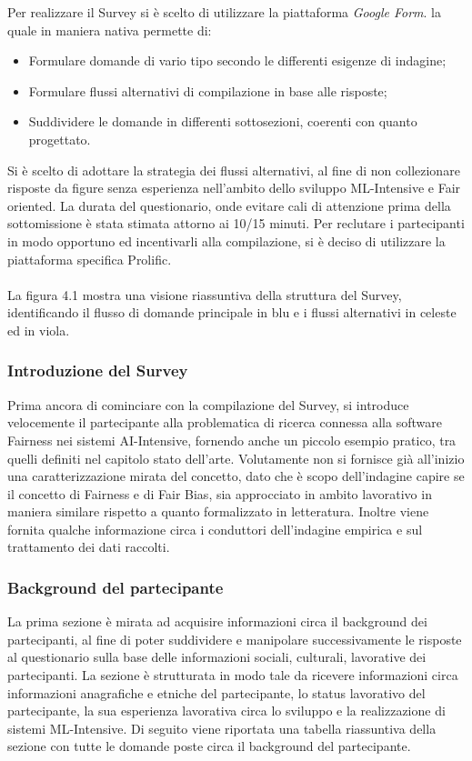     Per realizzare il Survey si è scelto di utilizzare la piattaforma \emph{Google Form}. la quale in maniera nativa permette di:
    \
    \begin{itemize}
        \item Formulare domande di vario tipo secondo le differenti esigenze di indagine;
        \item Formulare flussi alternativi di compilazione in base alle risposte;
        \item Suddividere le domande in differenti sottosezioni, coerenti con quanto progettato.
    \end{itemize}
    
    Si è scelto di adottare la strategia dei flussi alternativi, al fine di non collezionare risposte da figure senza esperienza nell'ambito dello sviluppo ML-Intensive e Fair oriented. La durata del questionario, onde evitare cali di attenzione prima della sottomissione è stata stimata attorno ai 10/15 minuti. Per reclutare i partecipanti in modo opportuno ed incentivarli alla compilazione, si è deciso di utilizzare la piattaforma specifica Prolific.\\ \\
    
    La figura 4.1 mostra una visione riassuntiva della struttura del Survey, identificando il flusso di domande principale in blu e i flussi alternativi in celeste ed in viola. 
    
   \subsubsection{Introduzione del Survey}
   Prima ancora di cominciare con la  compilazione del Survey, si introduce velocemente il partecipante alla problematica di ricerca connessa alla software Fairness nei sistemi AI-Intensive, fornendo anche un piccolo esempio pratico, tra quelli definiti nel capitolo stato dell'arte. Volutamente non si fornisce già all'inizio una caratterizzazione mirata del concetto, dato che è scopo dell'indagine capire se il concetto di Fairness e di Fair Bias, sia approcciato in ambito lavorativo in maniera similare rispetto a quanto formalizzato in letteratura. Inoltre viene fornita qualche informazione circa i conduttori dell'indagine empirica e sul trattamento dei dati raccolti. 
   
   \subsubsection{Background del partecipante}
   La prima sezione è mirata ad acquisire informazioni circa il background dei partecipanti, al fine di poter suddividere e manipolare successivamente le risposte al questionario sulla base delle informazioni sociali, culturali, lavorative dei partecipanti. La sezione è strutturata in modo tale da ricevere informazioni circa informazioni anagrafiche e etniche del partecipante, lo status lavorativo del partecipante, la sua esperienza lavorativa circa lo sviluppo e la realizzazione di sistemi ML-Intensive. Di seguito viene riportata una tabella riassuntiva della sezione con tutte le domande poste circa il background del partecipante.\\
   
